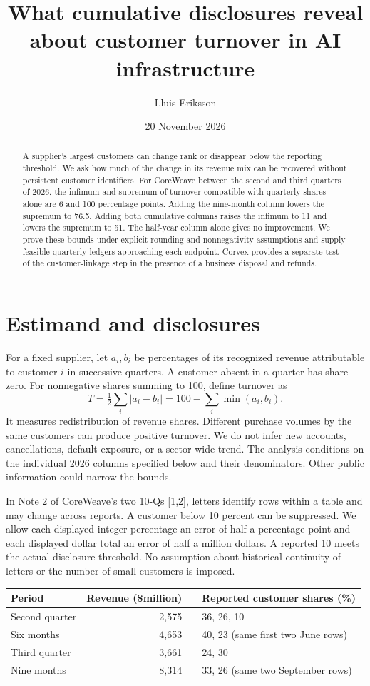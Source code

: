 \documentclass[11pt]{article}
\title{What cumulative disclosures reveal about customer turnover in AI infrastructure}
\author{Lluis Eriksson}\date{20 November 2026}
\begin{document}
\maketitle
\begin{abstract}
A supplier's largest customers can change rank or disappear below the reporting threshold. We ask how much of the change in its revenue mix can be recovered without persistent customer identifiers. For CoreWeave between the second and third quarters of 2026, the infimum and supremum of turnover compatible with quarterly shares alone are 6 and 100 percentage points. Adding the nine-month column lowers the supremum to 76.5. Adding both cumulative columns raises the infimum to 11 and lowers the supremum to 51. The half-year column alone gives no improvement. We prove these bounds under explicit rounding and nonnegativity assumptions and supply feasible quarterly ledgers approaching each endpoint. Corvex provides a separate test of the customer-linkage step in the presence of a business disposal and refunds.
\end{abstract}

\section{Estimand and disclosures}
For a fixed supplier, let $a_i,b_i$ be percentages of its recognized revenue attributable to customer $i$ in successive quarters. A customer absent in a quarter has share zero. For nonnegative shares summing to 100, define turnover as
\[
 T=\tfrac12\sum_i|a_i-b_i|=100-\sum_i\min(a_i,b_i).
\]
It measures redistribution of revenue shares. Different purchase volumes by the same customers can produce positive turnover. We do not infer new accounts, cancellations, default exposure, or a sector-wide trend. The analysis conditions on the individual 2026 columns specified below and their denominators. Other public information could narrow the bounds.

In Note 2 of CoreWeave's two 10-Qs [1,2], letters identify rows within a table and may change across reports. A customer below 10 percent can be suppressed. We allow each displayed integer percentage an error of half a percentage point and each displayed dollar total an error of half a million dollars. A reported 10 meets the actual disclosure threshold. No assumption about historical continuity of letters or the number of small customers is imposed.
\begin{center}\begin{tabular}{lrrl}\toprule
Period & Revenue (\$million) & & Reported customer shares (\%)\\\midrule
Second quarter & 2,575 && 36, 26, 10\\
Six months & 4,653 && 40, 23 (same first two June rows)\\
Third quarter & 3,661 && 24, 30\\
Nine months & 8,314 && 33, 26 (same two September rows)\\\bottomrule
\end{tabular}\end{center}
\end{document}
